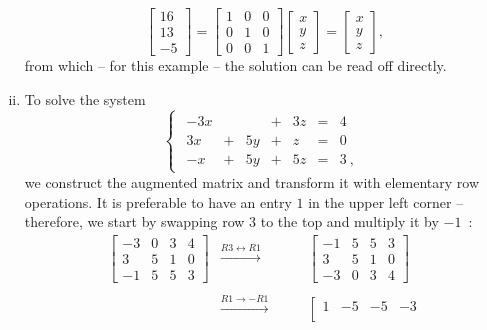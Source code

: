 \begin{example}
\begin{enumerate}[(i)]
\[\begin{bmatrix}
	16 \\ 13 \\ -5
	\end{bmatrix} = \begin{bmatrix}
	1 & 0 & 0 \\ 0 & 1 & 0 \\ 0 & 0 & 1 
	\end{bmatrix} \begin{bmatrix}
	x \\ y \\ z
	\end{bmatrix} = \begin{bmatrix}
	x \\ y \\ z
	\end{bmatrix}, \]
	from which -- for this example -- the solution can be read off directly.
	\item To solve the system
	\begin{equation*}
	\begin{cases}
	\begin{array}{rrrrrrr}
	-3x &   &    & + & 3z & = & 4 \phantom{\:,} \\
	 3x & + & 5y & + &  z & = & 0 \phantom{\:,} \\
	 -x & + & 5y & + & 5z & = & 3 \:,
	\end{array} \end{cases} 
	\end{equation*}
	we construct the augmented matrix and transform it with elementary row operations. It is preferable to have an entry $1$ in the upper left corner -- therefore, we start by swapping row 3 to the top and multiply it by $-1$~:
	\[ 
	\begin{array}{ccc}
	\left[\begin{array}{ccc|c}
	-3 & 0 & 3 & 4 \\
	3  & 5 & 1 & 0 \\
	-1 & 5 & 5 & 3 
	\end{array}\right] & \stackrel{R3 \leftrightarrow R1}{\rightarrow} \qquad & \left[\begin{array}{ccc|c}
	-1 & 5 & 5 & 3 \\
	3 & 5 & 1 & 0 \\
	-3 & 0 & 3 & 4 
	\end{array}\right] \\ & & \\
	& \stackrel{R1 \rightarrow - R1}{\rightarrow} \qquad & \left[\begin{array}{ccc|c}
	1 & -5 & -5 & -3 \\

\end{array}
\end{array}\]
\end{enumerate}
\end{example}
